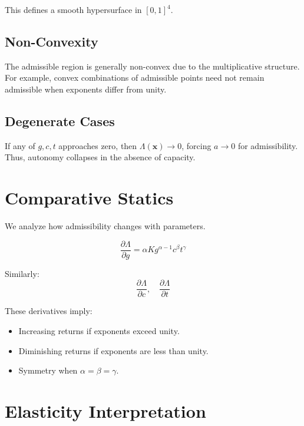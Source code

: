 \documentclass[letterpaper, 10 pt, conference]{ieeeconf}
\begin{document}
This defines a smooth hypersurface in $[0,1]^4$.

\subsection{Non-Convexity}

The admissible region is generally non-convex due to the multiplicative structure. For example, convex combinations of admissible points need not remain admissible when exponents differ from unity.

\subsection{Degenerate Cases}

If any of $g,c,t$ approaches zero, then $\Lambda(\mathbf{x}) \to 0$, forcing $a \to 0$ for admissibility. Thus, autonomy collapses in the absence of capacity.

\section{Comparative Statics}

We analyze how admissibility changes with parameters.

\begin{equation}
\frac{\partial \Lambda}{\partial g} = \alpha K g^{\alpha-1} c^\beta t^\gamma
\end{equation}

Similarly:
\begin{equation}
\frac{\partial \Lambda}{\partial c}, \quad \frac{\partial \Lambda}{\partial t}
\end{equation}

These derivatives imply:
\begin{itemize}
\item Increasing returns if exponents exceed unity.
\item Diminishing returns if exponents are less than unity.
\item Symmetry when $\alpha = \beta = \gamma$.
\end{itemize}

\section{Elasticity Interpretation}
\end{document}
